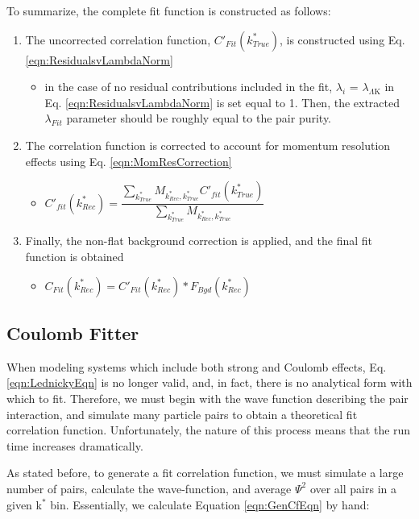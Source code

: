 \documentclass[ALICE,manyauthors]{cernphprep}
\begin{document}
To summarize, the complete fit function is constructed as follows:

\begin{enumerate}
 \item The uncorrected correlation function, $C'_{Fit}(k^{*}_{True})$, is constructed using Eq. \ref{eqn:ResidualsvLambdaNorm}
 \begin{itemize}
 \item in the case of no residual contributions included in the fit, $\lambda_{i}$ = $\lambda_{\Lambda\mathrm{K}}$ in Eq. \ref{eqn:ResidualsvLambdaNorm} is set equal to 1.  Then, the extracted $\lambda_{Fit}$ parameter should be roughly equal to the pair purity.
 \end{itemize}
 \item The correlation function is corrected to account for momentum resolution effects using Eq. \ref{eqn:MomResCorrection}
 \begin{itemize}
  \item $C'_{fit}(k^{*}_{Rec}) = \dfrac{\sum\limits_{k^{*}_{True}}M_{k^{*}_{Rec},k^{*}_{True}}C'_{fit}(k^{*}_{True})}{\sum\limits_{k^{*}_{True}}M_{k^{*}_{Rec},k^{*}_{True}}}$
 \end{itemize}
 \item Finally, the non-flat background correction is applied, and the final fit function is obtained
 \begin{itemize}
  \item $C_{Fit}(k^{*}_{Rec}) = C'_{Fit}(k^{*}_{Rec})*F_{Bgd}(k^{*}_{Rec})$
 \end{itemize}
\end{enumerate}



\subsection{Coulomb Fitter}
\label{CoulombFitter}

When modeling systems which include both strong and Coulomb effects, Eq. \ref{eqn:LednickyEqn} is no longer valid, and, in fact, there is no analytical form with which to fit.
Therefore, we must begin with the wave function describing the pair interaction, and simulate many particle pairs to obtain a theoretical fit correlation function.
Unfortunately, the nature of this process means that the run time increases dramatically.


As stated before, to generate a fit correlation function, we must simulate a large number of pairs, calculate the wave-function, and average $\Psi^{2}$ over all pairs in a given k$^{*}$ bin.  Essentially, we calculate Equation \ref{eqn:GenCfEqn} by hand:
\end{document}

